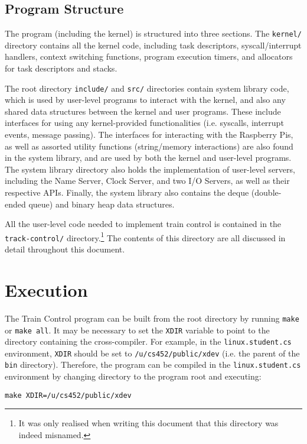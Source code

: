 \documentclass[12pt, titlepage]{article}
\begin{document}
    \subsection{Program Structure}

    The program (including the kernel) is structured into three sections. The \verb`kernel/` directory contains all the kernel code, including task descriptors, syscall/interrupt handlers, context switching functions, program execution timers, and allocators for task descriptors and stacks.

    The root directory \verb`include/` and \verb`src/` directories contain system library code, which is used by user-level programs to interact with the kernel, and also any shared data structures between the kernel and user programs. These include interfaces for using any kernel-provided functionalities (i.e. syscalls, interrupt events, message passing). The interfaces for interacting with the Raspberry Pis, as well as assorted utility functions (string/memory interactions) are also found in the system library, and are used by both the kernel and user-level programs. The system library directory also holds the implementation of user-level servers, including the Name Server, Clock Server, and two I/O Servers, as well as their respective APIs. Finally, the system library also contains the deque (double-ended queue) and binary heap data structures.

    All the user-level code needed to implement train control is contained in the \verb`track-control/` directory.\footnote{It was only realised when writing this document that this directory was indeed misnamed.} The contents of this directory are all discussed in detail throughout this document.

    \section{Execution}

    The Train Control program can be built from the root directory by running \verb`make` or \verb`make all`. It may be necessary to set the \verb`XDIR` variable to point to the directory containing the cross-compiler. For example, in the \verb`linux.student.cs` environment, \verb`XDIR` should be set to \verb`/u/cs452/public/xdev` (i.e. the parent of the \verb`bin` directory). Therefore, the program can be compiled in the \verb`linux.student.cs` environment by changing directory to the program root and executing:
    \begin{verbatim}
make XDIR=/u/cs452/public/xdev
    \end{verbatim}
\end{document}
